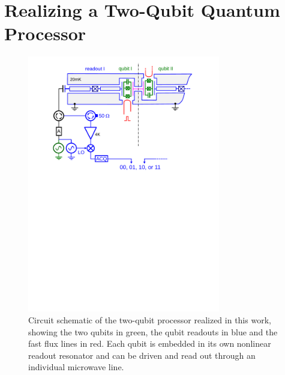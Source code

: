 \section{Realizing a Two-Qubit Quantum Processor}

\begin{figure}[ht!]
	\centering
		\includegraphics[width=0.75\textwidth]{./material/papers/grover/figures/2_qubit_processor_schematic}
	\caption[Circuit schematic of the realized two-qubit processor]{Circuit schematic of the two-qubit processor realized in this work, showing the two qubits in green, the qubit readouts in blue and the fast flux lines in red. Each qubit is embedded in its own nonlinear readout resonator and can be driven and read out through an individual microwave line.}
	\label{fig:two_qubit_processor_schematic}
\end{figure}

